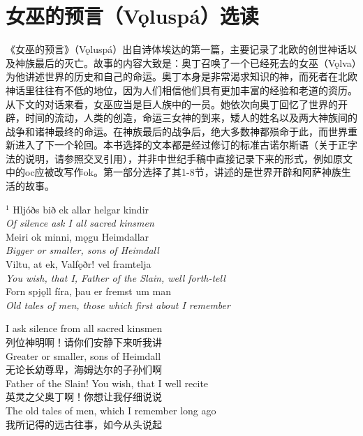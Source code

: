 \section{女巫的预言（Vǫluspá）选读}
《女巫的预言》（Vǫluspá）出自诗体埃达的第一篇，主要记录了北欧的创世神话以及神族最后的灭亡。故事的内容大致是：奥丁召唤了一个已经死去的女巫（Vǫlva）为他讲述世界的历史和自己的命运。奥丁本身是非常渴求知识的神，而死者在北欧神话里往往有不低的地位，因为人们相信他们具有更加丰富的经验和老道的资历。从下文的对话来看，女巫应当是巨人族中的一员。她依次向奥丁回忆了世界的开辟，时间的流动，人类的创造，命运三女神的到来，矮人的姓名以及两大神族间的战争和诸神最终的命运。在神族最后的战争后，绝大多数神都殒命于此，而世界重新进入了下一个轮回。本书选择的文本都是经过修订的标准古诺尔斯语（关于正字法的说明，请参照交叉引用），并非中世纪手稿中直接记录下来的形式，例如原文中的oc应被改写作ok。第一部分选择了其1-8节，讲述的是世界开辟和阿萨神族生活的故事。
\medskip %
\begin{paracol}{2}
    \noindent
    $^1 $ Hljóðs bið ek allar helgar kindir\\
    \textit{Of silence ask I all sacred kinsmen}\\
    Meiri ok minni, mǫgu Heimdallar\footnotemark\\
    \textit{Bigger or smaller, sons of Heimdall}\\
    Viltu, at ek, Valfǫðr\footnotemark! vel framtelja\\
    \textit{You wish, that I, Father of the Slain, well forth-tell}\\
    Forn spjǫll fíra, þau er fremst um man\\
    \textit{Old tales of men, those which first about I remember}\\
    \switchcolumn

    \noindent
    I ask silence from all sacred kinsmen\\
    列位神明啊！请你们安静下来听我讲\\
    Greater or smaller, sons of Heimdall\\
    无论长幼尊卑，海姆达尔的子孙们啊\\
    Father of the Slain! You wish, that I well recite\\
    英灵之父奥丁啊！你想让我仔细说说\\
    The old tales of men, which I remember long ago\\
    我所记得的远古往事，如今从头说起\\
\end{paracol}


